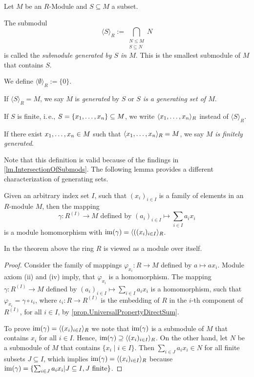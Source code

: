 \begin{defin}
Let $M$ be an $R$-Module and $S\subseteq M$ a subset.
\begin{thmlist}
\item The submodul \begin{equation*}
\langle S \rangle_R := \bigcap\limits_{\substack{N\leq M\\S\subseteq N}}N
\end{equation*}  is called the \emph{submodule generated by $S$ in $M$}. This is the smallest submodule of $M$ that contains $S$.
\item We define $\langle\emptyset\rangle_R:=\lbrace 0\rbrace$.
\item If $\langle S \rangle_R=M$, we say $M$ is \emph{generated} by $S$ or \emph{$S$ is a generating set of $M$}.
\item If $S$ is finite, i.\,e., $S=\lbrace x_{1},\ldots,x_{n}\rbrace\subseteq M$, we write $\langle x_{1},\ldots,x_{n}\rangle_R$ instead of $\langle S \rangle_R$.
\item If there exist $x_{1},\ldots,x_{n}\in M$ such that $\langle x_{1},\ldots,x_{n}\rangle_R=M$, we say \emph{$M$ is finitely generated}.
\end{thmlist}
\end{defin}
Note that this definition is valid because of the findings in \cref{lm.IntersectionOfSubmods}. The following lemma provides a different characterization of generating sets.

\begin{thm}\label{lem.Generating Set Homomorphism}
Given an arbitrary index set $I$, such that $(x_i)_{i\in I}$ is a family of elements in an $R$-module $M$, then the mapping
\begin{equation*}
\gamma\colon R^{(I)}\to M \text{ defined by } (a_i)_{i\in I}\mapsto \sum_{i\in I} a_i x_i
\end{equation*}
is a module homomorphism with $\operatorname{im}(\gamma)=\langle ((x_i)_{i\in I}\rangle_R$.
\end{thm}
In the theorem above the ring $R$ is viewed as a module over itself.
\begin{proof}
Consider the family of mappings $\varphi_{x_i}\colon R\to M$ defined by $a\mapsto ax_i$. Module axiom (ii) and (iv) imply, that $\varphi_{x_i}$ is a homomorphism. The mapping $\gamma\colon R^{(I)}\to M$ defined by $(a_i)_{i\in I}\mapsto\sum_{i\in I} a_ix_i$ is a homomorphism, such that $\varphi_{x_i}=\gamma\circ\iota_i$, where $\iota_i\colon R\to R^{(I)}$ is the embedding of $R$ in the $i$-th component of $R^{(I)}$, for all $i\in I$, by \cref{prop.UniversalPropertyDirectSum}.

To prove $\operatorname{im}(\gamma)=\langle (x_i)_{i\in I}\rangle_R$ we note that $\operatorname{im}(\gamma)$ is a submodule of $M$ that contains $x_i$ for all $i\in I$. Hence, $\operatorname{im}(\gamma)\supseteq\langle (x_i)_{i\in I}\rangle_R$. On the other hand, let $N$ be a submodule of $M$ that contains $\lbrace x_i\mid i\in I\rbrace$. Then $\sum_{i\in J} a_i x_i\in N$ for all finite subsets $J\subseteq I$, which implies $\operatorname{im}(\gamma)=\langle (x_i)_{i\in I}\rangle_R$ because $\operatorname{im}(\gamma)=\lbrace\sum_{i\in J} a_i x_i| J\subseteq I, J \text{ finite}\rbrace$.
\end{proof}

